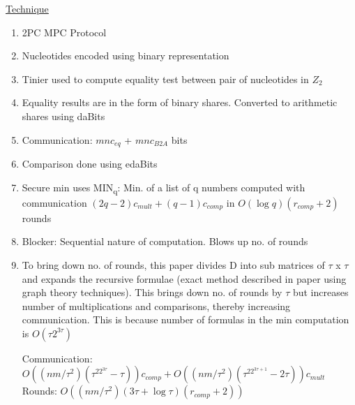 \underline{Technique}
\begin{enumerate}
   \item 2PC MPC Protocol
    \item Nucleotides encoded using binary representation 
    \item Tinier used to compute equality test between pair of nucleotides in $Z_2$ 
    \item Equality results are in the form of binary shares. Converted to arithmetic shares using daBits 
    \item Communication: $mnc_{eq}$ + $mnc_{B2A}$ bits 
    \item Comparison done using edaBits 
    \item Secure min uses MIN\textsubscript{q}: Min. of a list of q numbers computed with communication $(2q-2)c_{mult} + (q-1)c_{comp}$ in $O(\log q)(r_{comp}+2)$ rounds
    \item Blocker: Sequential nature of computation. Blows up no. of rounds
    \item To bring down no. of rounds, this paper divides D into sub matrices of $\tau$ x $\tau$ and expands the recursive formulae (exact method described in paper using graph theory techniques). This brings down no. of rounds by $\tau$ but increases number of multiplications and comparisons, thereby increasing communication. This is because number of formulas in the min computation is $O(\tau 2^{3\tau})$
    \begin{description}
        \item[Communication: $O((nm/\tau ^2)(\tau ^22^{3\tau}-\tau))c_{comp} + O((nm/\tau ^2)(\tau ^22^{3\tau + 1}-2\tau))c_{mult}$]
        \item[Rounds: $O((nm/\tau ^2)(3\tau + \log \tau)(r_{comp}+2))$ ]
    \end{description}
\end{enumerate}




%
